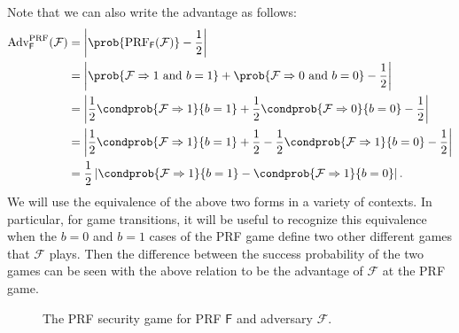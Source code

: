 \iffullversion
Note that we can also write the advantage as follows:
\begin{align*}
\text{Adv}^\mathrm{PRF}_\mathsf{F}(\mathcal{F})&=\left\lvert \prob{\text{PRF}_\mathsf{F}(\mathcal{F})}-\frac{1}{2} \right\rvert \\
&=\left\lvert \prob{\mathcal{F}\Rightarrow 1 \text{ and } b=1} + \prob{\mathcal{F}\Rightarrow 0 \text{ and } b=0} -\frac{1}{2} \right\rvert \\
&=\left\lvert \frac{1}{2}\condprob{\mathcal{F}\Rightarrow 1}{b=1} + \frac{1}{2}\condprob{\mathcal{F}\Rightarrow 0}{b=0} -\frac{1}{2} \right\rvert \\
&=\left\lvert \frac{1}{2}\condprob{\mathcal{F}\Rightarrow 1}{b=1} + \frac{1}{2} - \frac{1}{2}\condprob{\mathcal{F}\Rightarrow 1}{b=0} -\frac{1}{2} \right\rvert \\
&=\frac{1}{2} \left\lvert \condprob{\mathcal{F}\Rightarrow 1}{b=1} - \condprob{\mathcal{F}\Rightarrow 1}{b=0} \right\rvert. \\
\end{align*}
We will use the equivalence of the above two forms in a variety of contexts. In particular, for game transitions, it will be useful to recognize this equivalence when the $b=0$ and $b=1$ cases of the PRF game define two other different games that $\mathcal{F}$ plays. Then the difference between the success probability of the two games can be seen with the above relation to be the advantage of $\mathcal{F}$ at the PRF game.
\fi

\begin{figure}
\centering
\begin{pchstack}
\pchspace
{}
\end{pchstack}
\caption[The PRF security game]{The PRF security game for PRF $\mathsf{F}$ and adversary $\mathcal{F}$.}
\label{game:prfgame}
\end{figure}

